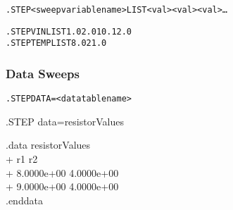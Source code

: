 \begin{Command}

\format
\begin{alltt}
.STEP <sweep variable name> LIST <val> <val> <val>\ldots
\end{alltt}

\examples
\begin{alltt}
.STEP VIN LIST 1.0 2.0 10. 12.0 
.STEP TEMP LIST 8.0 21.0
\end{alltt}

\end{Command}

\subsubsection{Data Sweeps}
 

\begin{Command}
\format
\begin{alltt}
.STEP DATA=<data table name> 
\end{alltt}

\examples
.STEP data=resistorValues

.data resistorValues \\
+ r1   r2 \\
+ 8.0000e+00  4.0000e+00 \\
+ 9.0000e+00  4.0000e+00 \\
.enddata

\end{Command}
